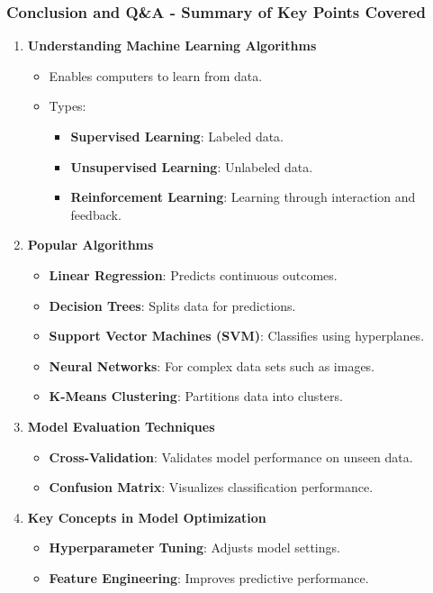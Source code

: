 \documentclass[aspectratio=169]{beamer}
\begin{document}
\begin{frame}[fragile]
  \frametitle{Conclusion and Q\&A - Summary of Key Points Covered}
  
  \begin{enumerate}  
    \item \textbf{Understanding Machine Learning Algorithms}  
    \begin{itemize}
      \item Enables computers to learn from data.
      \item Types:
        \begin{itemize}
          \item \textbf{Supervised Learning}: Labeled data.
          \item \textbf{Unsupervised Learning}: Unlabeled data.
          \item \textbf{Reinforcement Learning}: Learning through interaction and feedback.
        \end{itemize}
    \end{itemize}
    
    \item \textbf{Popular Algorithms}  
    \begin{itemize}
      \item \textbf{Linear Regression}: Predicts continuous outcomes.
      \item \textbf{Decision Trees}: Splits data for predictions.
      \item \textbf{Support Vector Machines (SVM)}: Classifies using hyperplanes.
      \item \textbf{Neural Networks}: For complex data sets such as images.
      \item \textbf{K-Means Clustering}: Partitions data into clusters.
    \end{itemize}
    
    \item \textbf{Model Evaluation Techniques}
    \begin{itemize}
      \item \textbf{Cross-Validation}: Validates model performance on unseen data.
      \item \textbf{Confusion Matrix}: Visualizes classification performance.
    \end{itemize}
    
    \item \textbf{Key Concepts in Model Optimization}
    \begin{itemize}
      \item \textbf{Hyperparameter Tuning}: Adjusts model settings.
      \item \textbf{Feature Engineering}: Improves predictive performance.
    \end{itemize}
  \end{enumerate}
\end{frame}
\end{document}
